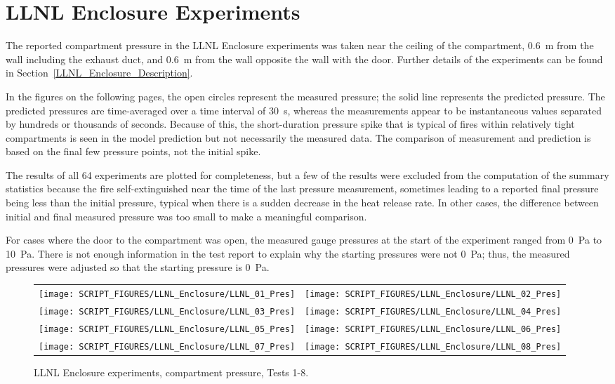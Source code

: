 \clearpage

\section{LLNL Enclosure Experiments}

The reported compartment pressure in the LLNL Enclosure experiments was taken near the ceiling of the compartment, 0.6~m from the wall including the exhaust duct, and 0.6~m from the wall opposite the wall with the door. Further details of the experiments can be found in Section~\ref{LLNL_Enclosure_Description}.

In the figures on the following pages, the open circles represent the measured pressure; the solid line represents the predicted pressure. The predicted pressures are time-averaged over a time interval of 30~s, whereas the measurements appear to be instantaneous values separated by hundreds or thousands of seconds. Because of this, the short-duration pressure spike that is typical of fires within relatively tight compartments is seen in the model prediction but not necessarily the measured data. The comparison of measurement and prediction is based on the final few pressure points, not the initial spike.

The results of all 64 experiments are plotted for completeness, but a few of the results were excluded from the computation of the summary statistics because the fire self-extinguished near the time of the last pressure measurement, sometimes leading to a reported final pressure being less than the initial pressure, typical when there is a sudden decrease in the heat release rate. In other cases, the difference between initial and final measured pressure was too small to make a meaningful comparison.

For cases where the door to the compartment was open, the measured gauge pressures at the start of the experiment ranged from 0~Pa to 10~Pa. There is not enough information in the test report to explain why the starting pressures were not 0~Pa; thus, the measured pressures were adjusted so that the starting pressure is 0~Pa.

\begin{figure}[p]
\begin{tabular*}{\textwidth}{l@{\extracolsep{\fill}}r}
\texttt{[image: SCRIPT\_FIGURES/LLNL\_Enclosure/LLNL\_01\_Pres]} &
\texttt{[image: SCRIPT\_FIGURES/LLNL\_Enclosure/LLNL\_02\_Pres]} \\
\texttt{[image: SCRIPT\_FIGURES/LLNL\_Enclosure/LLNL\_03\_Pres]} &
\texttt{[image: SCRIPT\_FIGURES/LLNL\_Enclosure/LLNL\_04\_Pres]} \\
\texttt{[image: SCRIPT\_FIGURES/LLNL\_Enclosure/LLNL\_05\_Pres]} &
\texttt{[image: SCRIPT\_FIGURES/LLNL\_Enclosure/LLNL\_06\_Pres]} \\
\texttt{[image: SCRIPT\_FIGURES/LLNL\_Enclosure/LLNL\_07\_Pres]} &
\texttt{[image: SCRIPT\_FIGURES/LLNL\_Enclosure/LLNL\_08\_Pres]}
\end{tabular*}
\caption{LLNL Enclosure experiments, compartment pressure, Tests 1-8.}
\label{LLNL_Enclosure_Pres_1}
\end{figure}

